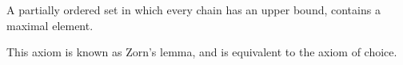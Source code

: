A partially ordered set in which every chain has an upper bound, contains a maximal element.

This axiom is known as Zorn's lemma, and is equivalent to the axiom of choice.
